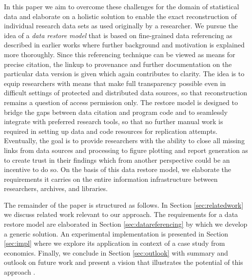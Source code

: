 \documentclass{acm_proc_article-sp}
\begin{document}
In this paper we aim to overcome these challenges for the domain of statistical data and elaborate on a holistic solution to enable the exact reconstruction of individual research data sets as used originally by a researcher.
We pursue the idea of a \emph{data restore model} that is based on fine-grained data referencing as described in earlier works \cite{BahlsTochtermann_2012}
where further background and motivation is explained more thoroughly.
Since this referencing technique can be viewed as means for precise citation, the linkup to provenance and further documentation on the particular data version is given which again contributes to clarity.
The idea is to equip researchers with means that make full transparency possible even in difficult settings of protected and distributed data sources, so that reconstruction remains a question of access permission only.
The restore model is designed to bridge the gaps between data citation and program code and to seamlessly integrate with preferred research tools, so that no further manual work is required in setting up data and code resources for replication attempts.
Eventually, the goal is to provide researchers with the ability to close all missing links from data sources and processing to figure plotting and report generation as to create trust in their findings which from another perspective could be an incentive to do so.
On the basis of this data restore model, we elaborate the requirements it carries on the entire information infrastructure between researchers, archives, and libraries.


 
The remainder of the paper is structured as follows. 
In Section \ref{sec:relatedwork} we discuss related work relevant to our approach. 
The requirements for a data restore model are elaborated in Section \ref{sec:datareferencing} by which we develop a generic solution.
An experimental implementation is presented in Section \ref{sec:impl} where we explore its application in context of a case study from economics.
Finally, we conclude in Section \ref{sec:outlook} with summary and outlook on future work and present a vision that illustrates the potential of this approach .
\end{document}

